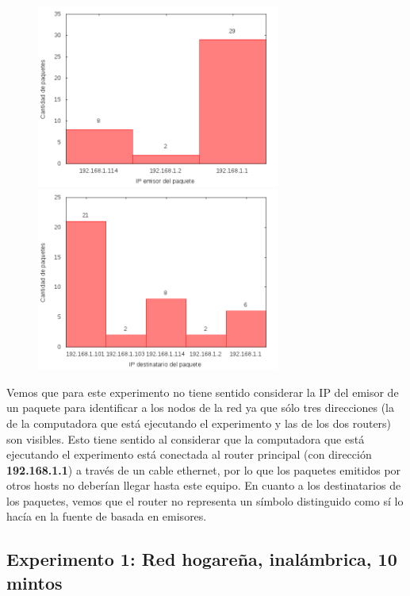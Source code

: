 \begin{figure}[!h]
\centering
\begin{minipage}{8cm}
  \centering
  \includegraphics[width=8cm]{../mediciones/home-eth-10/home-eth-10IpsSrcArp.png}
\end{minipage}%
\begin{minipage}{8cm}
  \centering
  \includegraphics[width=8cm]{../mediciones/home-eth-10/home-eth-10IpsDstArp.png}
\end{minipage}
\end{figure}

Vemos que para este experimento no tiene sentido considerar la IP del emisor de un paquete para identificar a los nodos de la red ya que sólo tres direcciones
(la de la computadora que está ejecutando el experimento y las de los dos routers) son visibles. Esto tiene sentido al considerar que la computadora que
está ejecutando el experimento está conectada al router principal (con dirección \textbf{192.168.1.1}) a través de un cable ethernet, por lo que los paquetes emitidos
por otros hosts no deberían llegar hasta este equipo. En cuanto a los destinatarios de los paquetes, vemos que el router no representa un símbolo distinguido
como sí lo hacía en la fuente de basada en emisores.

\subsection{Experimento 1: Red hogareña, inalámbrica, 10 mintos}

